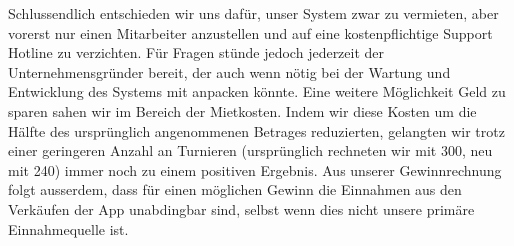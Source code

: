 Schlussendlich entschieden wir uns dafür, unser System zwar zu vermieten, aber vorerst nur einen Mitarbeiter anzustellen
    und auf eine kostenpflichtige Support Hotline zu verzichten.
Für Fragen stünde jedoch jederzeit der Unternehmensgründer bereit, der auch wenn nötig bei der Wartung und Entwicklung
    des Systems mit anpacken könnte.
Eine weitere Möglichkeit Geld zu sparen sahen wir im Bereich der Mietkosten.
Indem wir diese Kosten um die Hälfte des ursprünglich angenommenen Betrages reduzierten, gelangten wir trotz einer
geringeren Anzahl an Turnieren (ursprünglich rechneten wir mit 300, neu mit 240) immer noch zu einem positiven Ergebnis.
Aus unserer Gewinnrechnung folgt ausserdem, dass für einen möglichen Gewinn die Einnahmen aus den Verkäufen der App unabdingbar sind,
    selbst wenn dies nicht unsere primäre Einnahmequelle ist.